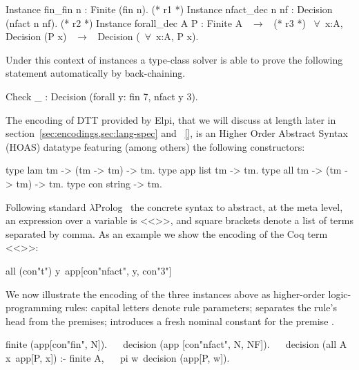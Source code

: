 \documentclass[sigconf,natbib=false]{acmart}
\begin{document}
\begin{coqcode}
Instance fin_fin n : Finite (fin n).              (* r1 *)
Instance nfact_dec n nf : Decision (nfact n nf).  (* r2 *)
Instance forall_dec A P : Finite A ~$\to$~             (* r3 *)
  ~$\forall$~x:A, Decision (P x) ~$\to$~ Decision (~$\forall$~x:A, P x).
\end{coqcode}

\noindent Under this context of instances a type-class solver is able to prove
the following statement automatically by back-chaining.

\begin{coqcode}
  Check _ : Decision (forall y: fin 7, nfact y 3).       ~~
\end{coqcode}

\noindent
The encoding of DTT provided by Elpi, that we will discuss at length later in
section~\ref{sec:encodings,sec:lang-spec} and ~\ref{}, is an Higher Order Abstract
Syntax (HOAS) datatype  featuring (among others) the following
constructors:

\begin{elpicode}
type lam  tm -> (tm -> tm) -> tm.     %
type app  list tm -> tm.              %
type all  tm -> (tm -> tm) -> tm.     %
type con  string -> tm.               %
\end{elpicode}

\noindent
Following standard $\lambda$Prolog~\cite{miller_nadathur_2012}
the concrete syntax to abstract, at the meta level, an expression
 over a variable 
is <<>>, and square brackets denote a list of
terms separated by comma. As an example we show the encoding of the Coq term
<<>>:

\begin{elpicode}
all (con"t") y\ app[con"nfact", y, con"3"]
\end{elpicode}

\noindent
We now illustrate the encoding of the three instances above as higher-order
logic-programming rules: capital letters denote rule
parameters; \elpiIn{:-} separates the rule's head from the premises;
 introduces a fresh nominal constant 
for the premise .

\begin{elpicode}
finite (app[con"fin", N]).                            ~~
decision (app [con"nfact", N, NF]).                   ~~
decision (all A x\ app[P, x]) :- finite A,            ~~
  pi w\ decision (app[P, w]).
\end{elpicode}
\end{document}
